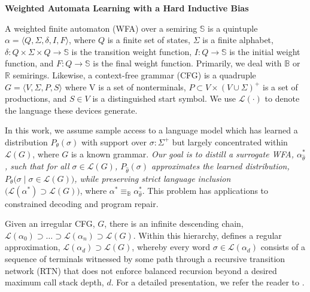 \documentclass[usletter,11pt]{article}
\begin{document}

\newcommand{\titlebox}[1]{%
  \begin{center}
  \begin{minipage}[c][3\baselineskip][c]{0.9\linewidth}%
  \centering\Large #1
  \end{minipage}%
  \end{center}
}

\titlebox{\textbf{Weighted Automata Learning with a Hard Inductive Bias}}

A weighted finite automaton (WFA) over a semiring \(\mathbb{S}\) is a quintuple \(\alpha = \langle Q, \Sigma, \delta, I, F\rangle \), where \(Q\) is a finite set of states, \(\Sigma\) is a finite alphabet, \(\delta \colon Q \times \Sigma \times Q \to \mathbb{S}\) is the transition weight function, \(I \colon Q \to \mathbb{S}\) is the initial weight function, and \(F \colon Q \to \mathbb{S}\) is the final weight function. Primarily, we deal with $\mathbb{B}$ or $\mathbb{R}$ semirings. Likewise, a context-free grammar (CFG) is a quadruple $G = \langle V, \Sigma, P, S \rangle$ where V is a set of nonterminals, $P \subset V\times (V\cup \Sigma)^+$ is a set of productions, and $S\in V$ is a distinguished start symbol. We use $\mathcal{L}(\cdot)$ to denote the language these devices generate.

In this work, we assume sample access to a language model which has learned a distribution $P_{\theta}(\sigma)$ with support over $\sigma: \Sigma^+$ but largely concentrated within $\mathcal{L}(G)$, where $G$ is a known grammar. \textit{Our goal is to distill a surrogate WFA, $\alpha^*_{\hat\theta}$, such that for all $\sigma \in \mathcal{L}(G)$, $P_{\hat\theta}(\sigma)$ approximates the learned distribution, $P_{\theta}\big(\sigma \mid \sigma \in \mathcal{L}(G)\big)$, while preserving strict language inclusion $\big(\mathcal{L}(\alpha^*)\supset \mathcal{L}(G)\big)$}, where $\alpha^* \equiv_{\mathbb{B}} \alpha^*_{\hat\theta}$. This problem has applications to constrained decoding and program repair.

Given an irregular CFG, $G$, there is an infinite descending chain, $\mathcal{L}(\alpha_0) \supset \ldots \supset \mathcal{L}(\alpha_n) \supset \mathcal{L}(G)$. Within this hierarchy, \cite{nederhof2000practical} defines a regular approximation, $\mathcal{L}(\alpha_d) \supset \mathcal{L}(G)$, whereby every word \(\sigma \in \mathcal{L}(\alpha_d)\) consists of a sequence of terminals witnessed by some path through a recursive transition network (RTN) that does not enforce balanced recursion beyond a desired maximum call stack depth, $d$. For a detailed presentation, we refer the reader to \cite{mohri2001regular}.
\end{document}
